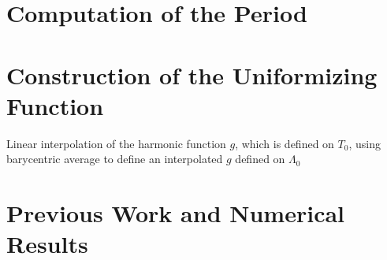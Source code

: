 \documentclass{article}
\begin{document}
\section{Computation of the Period}



\section{Construction of the Uniformizing Function}

Linear interpolation of the harmonic function $g$, which is defined on $T_0$, using barycentric average to define an interpolated $g$ defined on $\Lambda_0$

\section{Previous Work and Numerical Results}
\end{document}
